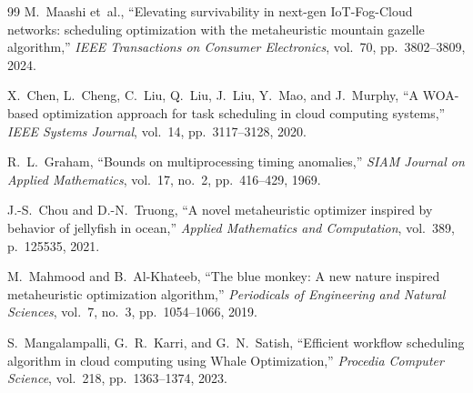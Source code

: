 \documentclass[journal]{IEEEtran}
\begin{document}
\begin{thebibliography}{99}
M.~Maashi et~al., ``Elevating survivability in next-gen IoT-Fog-Cloud networks:
scheduling optimization with the metaheuristic mountain gazelle algorithm,''
\textit{IEEE Transactions on Consumer Electronics}, vol.~70, pp.~3802--3809, 2024.

X.~Chen, L.~Cheng, C.~Liu, Q.~Liu, J.~Liu, Y.~Mao, and J.~Murphy, ``A WOA-based
optimization approach for task scheduling in cloud computing systems,''
\textit{IEEE Systems Journal}, vol.~14, pp.~3117--3128, 2020.

R.~L.~Graham, ``Bounds on multiprocessing timing anomalies,''
\textit{SIAM Journal on Applied Mathematics}, vol.~17, no.~2, pp.~416--429, 1969.

J.-S.~Chou and D.-N.~Truong, ``A novel metaheuristic optimizer inspired by behavior
of jellyfish in ocean,'' \textit{Applied Mathematics and Computation}, vol.~389,
p.~125535, 2021.

M.~Mahmood and B.~Al-Khateeb, ``The blue monkey: A new nature inspired metaheuristic
optimization algorithm,'' \textit{Periodicals of Engineering and Natural Sciences},
vol.~7, no.~3, pp.~1054--1066, 2019.

S.~Mangalampalli, G.~R.~Karri, and G.~N.~Satish, ``Efficient workflow scheduling
algorithm in cloud computing using Whale Optimization,'' \textit{Procedia Computer
Science}, vol.~218, pp.~1363--1374, 2023.

\end{thebibliography}
\end{document}
